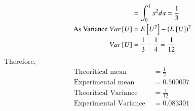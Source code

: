 \documentclass[journal,12pt,twocolumn]{IEEEtran}
\renewcommand\thesection{\arabic{section}}
\begin{document}
\begin{enumerate}[label=\thesection.\arabic*
,ref=\thesection.\theenumi]
\begin{enumerate}
\begin{align}
        &=\int_0^1x^2dx=\frac{1}{3}\\
        \text{ As Variance }Var{}\left[U\right]&= E{}\left[U^2\right]-\left(E{}\left[U\right]\right)^2\\
        Var{}\left[U\right]&=\frac{1}{3}-\frac{1}{4}=\frac{1}{12}
    \end{align}
Therefore,
\begin{align}
    \text{Theoritical mean }&=\frac{1}{2}\\
\text{Experimental mean }&=0.500007\\
\text{Theoritical Variance }&=\frac{1}{12}\\
\text{Experimental Variance }&=0.083301
\end{align}
\end{enumerate}
\end{enumerate}
\end{document}
